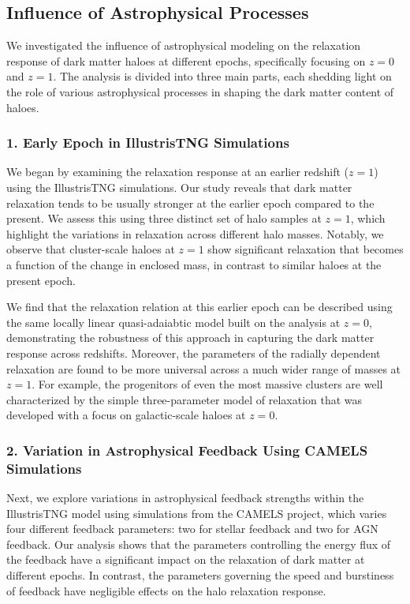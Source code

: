 \subsection*{Influence of Astrophysical Processes}
We investigated the influence of astrophysical modeling on the relaxation response of dark matter haloes at different epochs, specifically focusing on \( z=0 \) and \( z=1 \). The analysis is divided into three main parts, each shedding light on the role of various astrophysical processes in shaping the dark matter content of haloes.

\subsubsection*{1. Early Epoch in IllustrisTNG Simulations}
We began by examining the relaxation response at an earlier redshift (\( z=1 \)) using the IllustrisTNG simulations. Our study reveals that dark matter relaxation tends to be usually stronger at the earlier epoch compared to the present. We assess this using three distinct set of halo samples at \(z=1\), which highlight the variations in relaxation across different halo masses. Notably, we observe that cluster-scale haloes at \( z=1 \) show significant relaxation that becomes a function of the change in enclosed mass, in contrast to similar haloes at the present epoch.

We find that the relaxation relation at this earlier epoch can be described using the same locally linear quasi-adaiabtic model built on the analysis at \(z=0\), demonstrating the robustness of this approach in capturing the dark matter response across redshifts. Moreover, the parameters of the radially dependent relaxation are found to be more universal across a much wider range of masses at \( z=1 \). For example, the progenitors of even the most massive clusters are well characterized by the simple three-parameter model of relaxation that was developed with a focus on galactic-scale haloes at \( z=0 \).

\subsubsection*{2. Variation in Astrophysical Feedback Using CAMELS Simulations}
Next, we explore variations in astrophysical feedback strengths within the IllustrisTNG model using simulations from the CAMELS project, which varies four different feedback parameters: two for stellar feedback and two for AGN feedback. Our analysis shows that the parameters controlling the energy flux of the feedback have a significant impact on the relaxation of dark matter at different epochs. In contrast, the parameters governing the speed and burstiness of feedback have negligible effects on the halo relaxation response.

